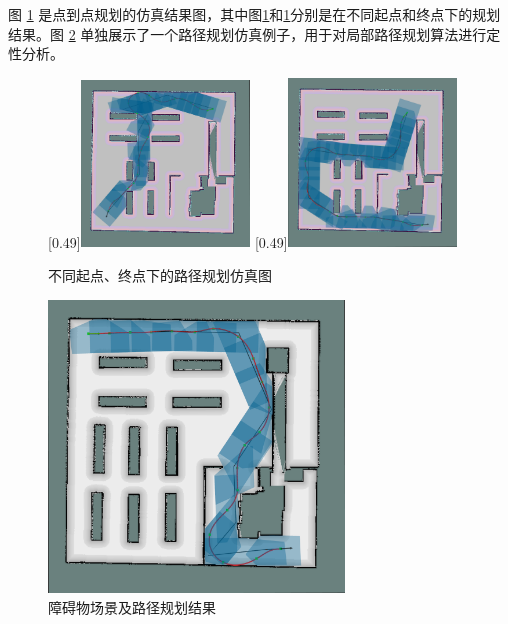 \documentclass[master,academic]{ysuthesis} %
\begin{document}
		图 \ref{fig:点到点路径规划仿真案例} 是点到点规划的仿真结果图，其中图\ref{fig:点到点路径规划仿真案例}和\ref{fig:点到点路径规划仿真案例}分别是在不同起点和终点下的规划结果。图 \ref{fig:single} 单独展示了一个路径规划仿真例子，用于对局部路径规划算法进行定性分析。
		\begin{figure}[H]
			\centering
			[0.49\textwidth]{\includegraphics[width=0.4\textwidth]{single_3.png}}
			[0.49\textwidth]{\includegraphics[width=0.4\textwidth]{single_4.png}}
			\caption{不同起点、终点下的路径规划仿真图}
			\label{fig:点到点路径规划仿真案例}
		\end{figure}

		\begin{figure}[H]
			\centering
			\includegraphics[width=0.7\textwidth]{single.png}
			\caption{障碍物场景及路径规划结果}
			\label{fig:single}
		\end{figure}
		
\end{document}
